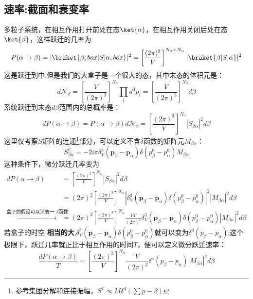 \subsection{速率:截面和衰变率}
多粒子系统，在相互作用打开前处在态$\ket{\alpha}$，在相互作用关闭后处在态$\ket{\beta}$，这样跃迁的几率为
$$
    P(\alpha\to\beta)=|\braket{\beta;box|S|\alpha;box}|^2=\left[\frac{(2\pi)^3}{V}\right]^{N_\beta+N_\alpha}|\braket{\beta|S|\alpha}|^2
$$
这是跃迁到中.但是我们的大盒子是一个很大的态，其中末态的体积元是：
$$
    d\mathcal{N}_\beta=\left[\frac{V}{(2\pi)^3}\right]^{N_\beta}\prod_{i}d^3p_i=\left[\frac{V}{(2\pi)^3}\right]^{N_\beta}d\beta
$$
系统跃迁到末态$d\beta$范围内的总概率是：
\begin{equation}
    dP(\alpha\to\beta)=P(\alpha\to\beta)d\mathcal{N}_\beta=\left[ \frac{(2\pi)^3}{V}\right]^{N_\alpha}|S_{\beta\alpha}|^2d\beta
\end{equation}
这里仅考察$S$矩阵的连通\footnote{参考集团分解和连接振幅，$S^\mathbb{C}\varpropto M\delta^4(\sum p-\beta)$}部分，可以定义不含$\delta$函数的矩阵元$M_{\beta\alpha}$：
$$
    S^\mathbb{C}_{\beta\alpha}=-2i\pi\delta^3_V(\boldsymbol{p}_{\beta}-\boldsymbol{p}_{\alpha})\delta(p^0_\beta-p^0_\alpha)M_{\beta\alpha}
$$
这种条件下，微分跃迁几率变为
\begin{equation}
    \begin{aligned}
        dP(\alpha\to\beta)
        &=\left[ \frac{(2\pi)^3}{V}\right]^{N_\alpha}|S_{\beta\alpha}|^2d\beta
        \\&=
        (2\pi)^2\left[ \frac{(2\pi)^3}{V}\right]^{N_\alpha}|\delta^3_V(\boldsymbol{p}_{\beta}-\boldsymbol{p}_{\alpha})\delta(p^0_\beta-p^0_\alpha)|^2|M_{\beta\alpha}|^2d\beta
        \\\overset{\text{盒子的假设可以消去一些}\delta\text{函数}}{\longrightarrow}&=
        (2\pi)^2\left[ \frac{(2\pi)^3}{V}\right]^{N_\alpha}\frac{VT}{(2\pi)^4}\delta^3_V(\boldsymbol{p}_{\beta}-\boldsymbol{p}_{\alpha})\delta(p^0_\beta-p^0_\alpha)|M_{\beta\alpha}|^2d\beta
    \end{aligned}
\end{equation}
若盒子的时空 \textbf{相当的大},$\delta^3_V(\boldsymbol{p}_{\beta}-\boldsymbol{p}_{\alpha})\delta(p^0_\beta-p^0_\alpha)$就可以变为$\delta^4(p_\beta-p_\alpha)$;这个极限下，跃迁几率就正比于相互作用的时间$T$，便可以定义微分跃迁速率：
\begin{equation}
    \frac{dP(\alpha\to\beta)}{T}=\left[ \frac{(2\pi)^3}{V}\right]^{N_\alpha}\frac{V}{(2\pi)^2}\delta^4(p_\beta-p_\alpha)|M_{\beta\alpha}|^2d\beta
\end{equation}
